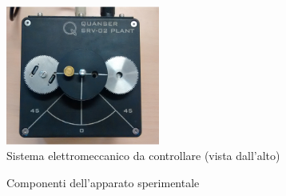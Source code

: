 \documentclass[english]{article}
\begin{document}
	\begin{figure}[H]
		\centering
		\includegraphics[width=0.45\textwidth]{./figure/motore}
		\caption{Sistema elettromeccanico da controllare (vista dall'alto)}
		\label{fig:fotoMotore}
	\end{figure}
	
	\begin{figure}[!ht]
		\centering
		\caption{Componenti dell'apparato sperimentale}
	\end{figure}
	
\end{document}
